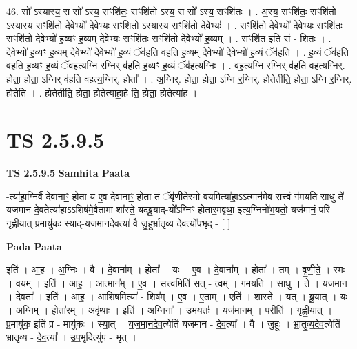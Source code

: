 \documentclass[17pt]{extarticle}
\begin{document}
46. सो᳚ ऽस्यास्य॒ स सो᳚ ऽस्य॒ सꣳशि॑तः॒ सꣳशि॑तो ऽस्य॒ स सो᳚ ऽस्य॒ सꣳशि॑तः । . अ॒स्य॒ सꣳशि॑तः॒ सꣳशि॑तो ऽस्यास्य॒ सꣳशि॑तो दे॒वेभ्यो॑ दे॒वेभ्यः॒ सꣳशि॑तो ऽस्यास्य॒ सꣳशि॑तो दे॒वेभ्यः॑ । . सꣳशि॑तो दे॒वेभ्यो॑ दे॒वेभ्यः॒ सꣳशि॑तः॒ सꣳशि॑तो दे॒वेभ्यो॑ ह॒व्यꣳ ह॒व्यम् दे॒वेभ्यः॒ सꣳशि॑तः॒ सꣳशि॑तो दे॒वेभ्यो॑ ह॒व्यम् । . सꣳशि॑त॒ इति॒ सं - शि॒तः॒ । . दे॒वेभ्यो॑ ह॒व्यꣳ ह॒व्यम् दे॒वेभ्यो॑ दे॒वेभ्यो॑ ह॒व्यं ॅव॑हति वहति ह॒व्यम् दे॒वेभ्यो॑ दे॒वेभ्यो॑ ह॒व्यं ॅव॑हति । . ह॒व्यं ॅव॑हति वहति ह॒व्यꣳ ह॒व्यं ॅव॑हत्य॒ग्नि र॒ग्निर् व॑हति ह॒व्यꣳ ह॒व्यं ॅव॑हत्य॒ग्निः । . व॒ह॒त्य॒ग्नि र॒ग्निर् व॑हति वहत्य॒ग्निर्. होता॒ होता॒ ऽग्निर् व॑हति वहत्य॒ग्निर्. होता᳚ । . अ॒ग्निर्. होता॒ होता॒ ऽग्नि र॒ग्निर्. होतेतीति॒ होता॒ ऽग्नि र॒ग्निर्. होतेति॑ । . होतेतीति॒ होता॒ होतेत्या॑हा॒हे ति॒ होता॒ होतेत्या॑ह । \newline
\pagebreak
{}

\section{ TS 2.5.9.5 }

\textbf{TS 2.5.9.5 } \newline
\textbf{Samhita Paata} \newline

-त्या॑हा॒ग्निर्वै दे॒वानाꣳ॒॒ होता॒ य ए॒व दे॒वानाꣳ॒॒ होता॒ तं ॅवृ॑णीते॒स्मो व॒यमित्या॑हा॒ऽऽत्मान॑मे॒व स॒त्त्वं ग॑मयति सा॒धु ते॑ यजमान दे॒वतेत्या॑हा॒ऽऽशिष॑मे॒वैतामा शा᳚स्ते॒ यद्ब्रू॒याद्-यो᳚ऽग्निꣳ होता॑र॒मवृ॑था॒ इत्य॒ग्निनो॑भ॒यतो॒ यज॑मानं॒ परि॑ गृह्णीयात् प्र॒मायु॑कः स्याद्-यजमानदेव॒त्या॑ वै जु॒हूर्भ्रा॑तृव्य देव॒त्यो॑प॒भृद् - [  ] \newline

\textbf{Pada Paata} \newline

इति॑ । आ॒ह॒ । अ॒ग्निः । वै । दे॒वाना᳚म् । होता᳚ । यः । ए॒व । दे॒वाना᳚म् । होता᳚ । तम् । वृ॒णी॒ते॒ । स्मः । व॒यम् । इति॑ । आ॒ह॒ । आ॒त्मान᳚म् । ए॒व । स॒त्त्वमिति॑ सत् - त्वम् । ग॒म॒य॒ति॒ । सा॒धु । ते॒ । य॒ज॒मा॒न॒ । दे॒वता᳚ । इति॑ । आ॒ह॒ । आ॒शिष॒मित्या᳚ - शिष᳚म् । ए॒व । ए॒ताम् । एति॑ । शा॒स्ते॒ । यत् । ब्रू॒यात् । यः । अ॒ग्निम् । होता॑रम् । अवृ॑थाः । इति॑ । अ॒ग्निना᳚ । उ॒भ॒यतः॑ । यज॑मानम् । परीति॑ । गृ॒ह्णी॒या॒त् । प्र॒मायु॑क॒ इति॑ प्र - मायु॑कः । स्या॒त् । य॒ज॒मा॒न॒दे॒व॒त्येति॑ यजमान - दे॒व॒त्या᳚ । वै । जु॒हूः । भ्रा॒तृ॒व्य॒दे॒व॒त्येति॑ भ्रातृव्य - दे॒व॒त्या᳚ । उ॒प॒भृदित्यु॑प - भृत् ।  \newline
\end{document}

